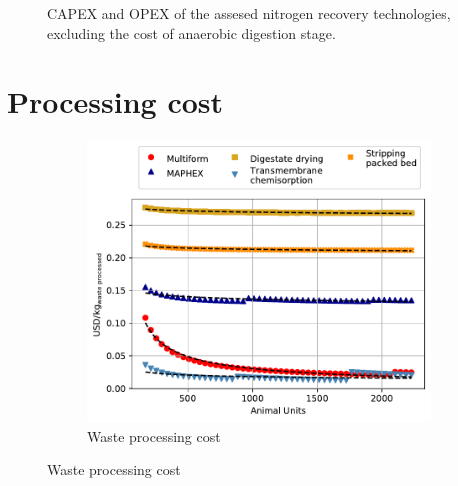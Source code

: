 \begin{refsection}[referencesApD]
\begin{figure}[h!]
	\caption{CAPEX and OPEX of the assesed nitrogen recovery technologies, excluding the cost of anaerobic digestion stage.} \label{fig:CAPEXOPEX_NoAD}
\end{figure}

\newpage

\section{Processing cost}
\begin{figure}[h!]
	\centering 
	\begin{subfigure}[t]{0.7\textwidth}
		\centering
		\includegraphics[width=1\linewidth, trim={0cm 0cm 0cm 0cm},clip]{gfx/AppendixD/ScaleUp2WasteProcCost_NoAD.pdf} 
		\caption{Waste processing cost}
		\label{fig:ScaleUp2WasteProcCost_NoAD}
	\end{subfigure}

	\bigskip


\end{figure}
\end{refsection}
